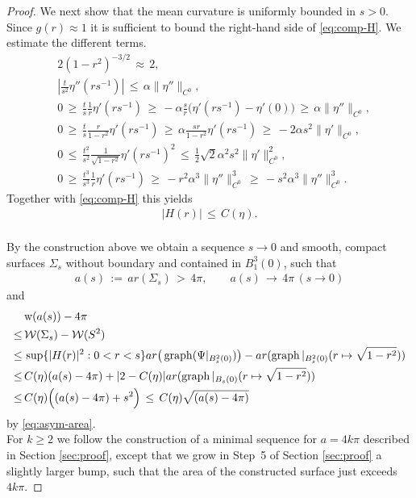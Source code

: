 \documentclass[reqno,makeidx,12pt]{amsart}
\theoremstyle{note}
\theoremstyle{definition}
\begin{document}
\begin{proof}
We next show that the mean curvature is uniformly bounded in
$s>0$. Since $g(r)\approx 1$ it is sufficient to bound the right-hand
side of \eqref{eq:comp-H}. We estimate the different terms.
\begin{align*}
  &2(1-r^2)^{-3/2} \,\approx\, 2,\\
  &|\frac{t}{s^2}\eta''(rs^{-1})| \,\leq\, \alpha
  \|\eta''\|_{C^0},\\
  &0\,\geq\, \frac{t}{s}\frac{1}{r}\eta'(rs^{-1})\,\geq\, -\alpha
  \frac{s}{r}\big(\eta'(rs^{-1})-\eta'(0)\big)\,\geq\,
  \alpha\|\eta''\|_{C^0},\\
  &0\,\geq\, \frac{t}{s}\frac{r}{1-r^2}\eta'(rs^{-1})\,\geq\,
  \alpha\frac{sr}{1-r^2} \eta'(rs^{-1})\,\geq\, -
  2\alpha s^2\|\eta'\|_{C^0},\\
  &0\,\leq\,\frac{t^2}{s^2}\frac{1}{\sqrt{1-r^2}}\eta'(rs^{-1})^2
  \,\leq\, \frac{1}{2}\sqrt{2}\alpha^2 s^2\|\eta'\|_{C^0}^2,\\ 
  &0\,\geq\,\frac{t^3}{s^3}\frac{1}{r}\eta'(rs^{-1})\,\geq\,-r^2\alpha^3\|\eta''\|_{C^0}^3
  \,\geq\,-s^2\alpha^3\|\eta''\|_{C^0}^3.
\end{align*}
Together with \eqref{eq:comp-H} this yields
\begin{gather}
  |H(r)|\,\leq\, C(\eta). \label{eq:est-H}
\end{gather}
{\mbox{}\\\underline{}}
By the construction above we obtain a sequence $s\to 0$ and smooth,
compact surfaces $\Sigma_s$ without boundary
and contained in $B_1^3(0)$, such that 
\begin{gather*}
  a(s)\,:=\,{ar}(\Sigma_s)\,>\,4\pi,\qquad a(s)\,\to\, 4\pi \,(s\to 0)
\end{gather*}
and
\begin{align*}
  &{\text{w}}(a(s))-  4\pi \\
  \leq\,&
  {\mathcal{W}}(\Sigma_s)-{\mathcal{W}}(S^2) \\
  \leq\,&
  \sup\{|H(r)|^2:0<r<s\}{ar}\big(\operatorname{graph}(\Psi|_{B_s^2(0)})\big)
  -  {ar}(\operatorname{graph}|_{B_s^2(0)}(r\mapsto \sqrt{1-r^2}))\notag\\
  \leq\,& C(\eta) (a(s)-4\pi) +
  |2-C(\eta)|{ar}(\operatorname{graph}|_{B_s(0)}(r\mapsto \sqrt{1-r^2}))\\
  \leq\, & C(\eta)\Big((a(s)-4\pi) + s^2\Big)\,\leq\, C(\eta)\sqrt{(a(s)-4\pi)}
\end{align*}
by \eqref{eq:asym-area}.
{\mbox{}\\\underline{}}
For $k\geq 2$ we follow the construction of a minimal sequence for
$a=4k\pi $ described in Section \ref{sec:proof}, except that we grow in
Step~5 of Section \ref{sec:proof} a slightly larger bump, such that the area of
the constructed surface just exceeds $4k\pi $.
\end{proof}
\end{document}
